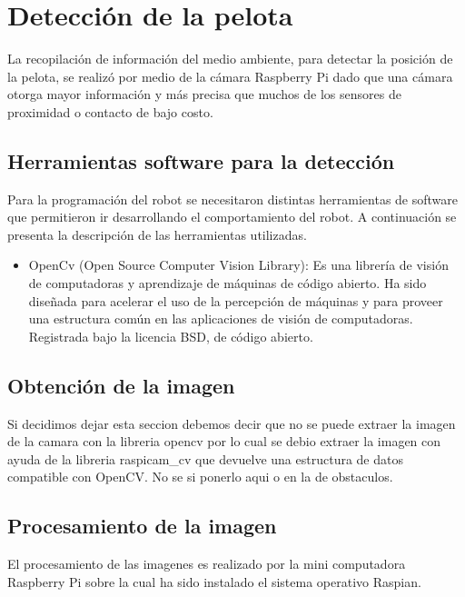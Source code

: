 \section{Detección de la pelota}\label{chapter:deteccion}

La recopilación de información del medio ambiente, para detectar la posición de la pelota, se realiz\'o por medio de la cámara Raspberry Pi dado que una cámara otorga mayor información y más precisa que muchos de los sensores de proximidad o contacto de bajo costo. 

\subsection{Herramientas software para la detecci\'on }

Para la programación del robot se necesitaron distintas herramientas de software que permitieron ir desarrollando el comportamiento del robot. A continuación se presenta la descripción de las herramientas utilizadas. 

\begin{itemize}

\item OpenCv (Open Source Computer Vision Library): Es una librería de visión de computadoras y aprendizaje de máquinas de código abierto. Ha sido diseñada para acelerar el uso de la percepción de m\'aquinas y para proveer una estructura común en las aplicaciones de visión de computadoras. Registrada bajo la licencia BSD, de código abierto. \cite{opencv}

\end{itemize}

\subsection{Obtenci\'on de la imagen}

Si decidimos dejar esta seccion debemos decir que no se puede extraer la imagen de la camara con la libreria opencv por lo cual se debio extraer la imagen con ayuda de la libreria raspicam\_cv que devuelve una estructura de datos compatible con OpenCV. No se si ponerlo aqui o en la de obstaculos. 

\subsection{Procesamiento de la imagen}

El procesamiento de las imagenes es realizado por la mini computadora Raspberry Pi sobre la cual ha sido instalado el sistema operativo Raspian.

